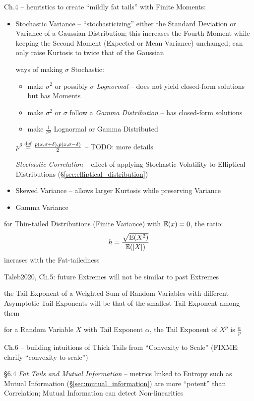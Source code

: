 Ch.4 -- heuristics to create ``mildly fat tails'' with Finite Moments:

\begin{itemize}
  \item Stochastic Variance -- ``stochasticizing'' either the Standard Deviation
    or Variance of a Gaussian Distribution; this increases the Fourth Moment
    while keeping the Second Moment (Expected or Mean Variance) unchanged; can
    only raise Kurtosis to twice that of the Gaussian

    ways of making $\sigma$ Stochastic:
    \begin{itemize}
      \item make $\sigma^2$ or possibly $\sigma$ \emph{Lognormal} -- does not
        yield closed-form solutions but has Moments
      \item make $\sigma^2$ or $\sigma$ follow a \emph{Gamma Distribution}
        -- has closed-form solutions
      \item make $\frac{1}{\sigma^2}$ Lognormal or Gamma Distributed
    \end{itemize}

    $p^\delta \stackrel{\mathrm{def}}= \frac{p(x, \sigma + \delta), p(x, \sigma - \delta)}{2}$
    -- TODO: more details

    \emph{Stochastic Correlation} -- effect of applying Stochastic Volatility to
    Elliptical Distributions (\S\ref{sec:elliptical_distribution})
  \item Skewed Variance -- allows larger Kurtosis while preserving Variance
  \item Gamma Variance
\end{itemize}

for Thin-tailed Distributions (Finite Variance) with $\mathbb{E}(x) = 0$, the
ratio:
\[
  h = \frac{\sqrt{\mathbb{E}(X^2)}}{\mathbb{E}(|X|)}
\]
incrases with the Fat-tailedness

Taleb2020, Ch.5: future Extremes will not be similar to past Extremes

the Tail Exponent of a Weighted Sum of Random Variables with different
Asymptotic Tail Exponents will be that of the smallest Tail Exponent among them

for a Random Variable $X$ with Tail Exponent $\alpha$, the Tail Exponent of
$X^p$ is $\frac{\alpha}{p}$

Ch.6 -- building intuitions of Thick Tails from ``Convexity to Scale'' (FIXME:
clarify ``convexity to scale'')

\S 6.4 \emph{Fat Tails and Mutual Information}
-- metrics linked to Entropy such as Mutual Information
(\S\ref{sec:mutual_information}) are more ``potent'' than Correlation; Mutual
Information can detect Non-linearities

